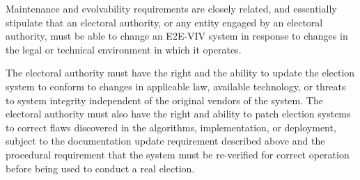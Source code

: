 Maintenance and evolvability requirements are closely related, and
essentially stipulate that an electoral authority, or any entity
engaged by an electoral authority, must be able to change an E2E-VIV
system in response to changes in the legal or technical environment in
which it operates. 

The electoral authority must have the right and the ability to update
the election system to conform to changes in applicable law, available
technology, or threats to system integrity independent of the original
vendors of the system. The electoral authority must also have the
right and ability to patch election systems to correct flaws
discovered in the algorithms, implementation, or deployment, subject
to the documentation update requirement described above and the
procedural requirement that the system must be re-verified for correct
operation before being used to conduct a real election.
